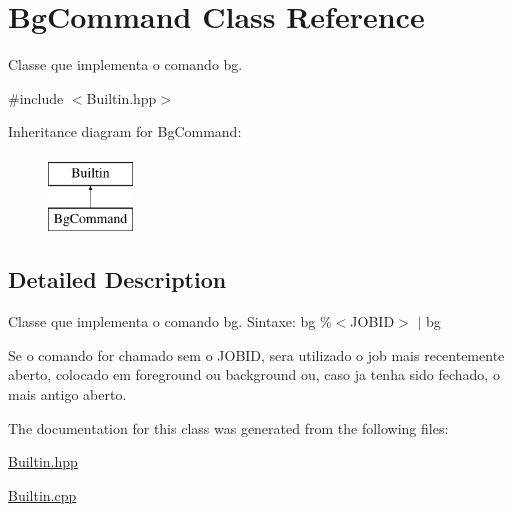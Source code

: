 \hypertarget{classBgCommand}{
\section{BgCommand Class Reference}
\label{classBgCommand}
}


Classe que implementa o comando bg.  




{\ttfamily \#include $<$Builtin.hpp$>$}

Inheritance diagram for BgCommand:\begin{figure}[H]
\begin{center}
\leavevmode
\includegraphics[height=2.000000cm]{classBgCommand}
\end{center}
\end{figure}


\subsection{Detailed Description}
Classe que implementa o comando bg. Sintaxe: bg \%$<$JOBID$>$ $|$ bg\par
 Se o comando for chamado sem o JOBID, sera utilizado o job mais recentemente aberto, colocado em foreground ou background ou, caso ja tenha sido fechado, o mais antigo aberto. 

The documentation for this class was generated from the following files:\begin{DoxyCompactItemize}
\item 
\hyperlink{Builtin_8hpp}{Builtin.hpp}\item 
\hyperlink{Builtin_8cpp}{Builtin.cpp}\end{DoxyCompactItemize}
